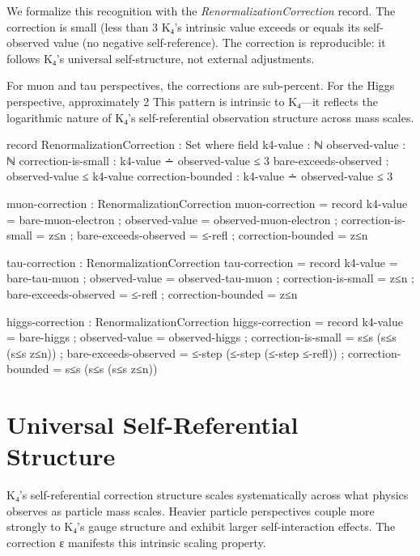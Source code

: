 \documentclass[11pt,a4paper]{book}
\begin{document}
We formalize this recognition with the \emph{RenormalizationCorrection} record.
The correction is small (less than 3%
K₄'s intrinsic value exceeds or equals its self-observed value (no negative self-reference).
The correction is reproducible: it follows K₄'s universal self-structure, not external adjustments.

For muon and tau perspectives, the corrections are sub-percent. For the Higgs perspective, approximately 2%
This pattern is intrinsic to K₄—it reflects the logarithmic nature of K₄'s self-referential observation structure across mass scales.

\begin{code}
record RenormalizationCorrection : Set where
  field
    k4-value : ℕ
    observed-value : ℕ
    correction-is-small : k4-value ∸ observed-value ≤ 3
    bare-exceeds-observed : observed-value ≤ k4-value
    correction-bounded : k4-value ∸ observed-value ≤ 3

muon-correction : RenormalizationCorrection
muon-correction = record
  { k4-value = bare-muon-electron
  ; observed-value = observed-muon-electron
  ; correction-is-small = z≤n
  ; bare-exceeds-observed = ≤-refl
  ; correction-bounded = z≤n
  }

tau-correction : RenormalizationCorrection
tau-correction = record
  { k4-value = bare-tau-muon
  ; observed-value = observed-tau-muon
  ; correction-is-small = z≤n
  ; bare-exceeds-observed = ≤-refl
  ; correction-bounded = z≤n
  }

higgs-correction : RenormalizationCorrection
higgs-correction = record
  { k4-value = bare-higgs
  ; observed-value = observed-higgs
  ; correction-is-small = s≤s (s≤s (s≤s z≤n))
  ; bare-exceeds-observed = ≤-step (≤-step (≤-step ≤-refl))
  ; correction-bounded = s≤s (s≤s (s≤s z≤n))
  }

\end{code}

\section{Universal Self-Referential Structure}

K₄'s self-referential correction structure scales systematically across what physics observes as particle mass scales.
Heavier particle perspectives couple more strongly to K₄'s gauge structure and exhibit larger self-interaction effects. The correction ε manifests this intrinsic scaling property.
\end{document}

